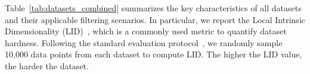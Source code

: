 \documentclass[sigconf, nonacm]{acmart}
\begin{document}
	Table~\ref{tab:datasets_combined} summarizes the key characteristics of all datasets and their applicable filtering scenarios. In particular, we report the Local Intrinsic Dimensionality (LID)~\cite{Lid}, which is a commonly used metric to quantify dataset hardness. Following the standard evaluation protocol~\cite{LID2}, we randomly sample 10,000 data points from each dataset to compute LID. The higher the LID value, the harder the dataset.
	
	
	
	
	
\end{document}
